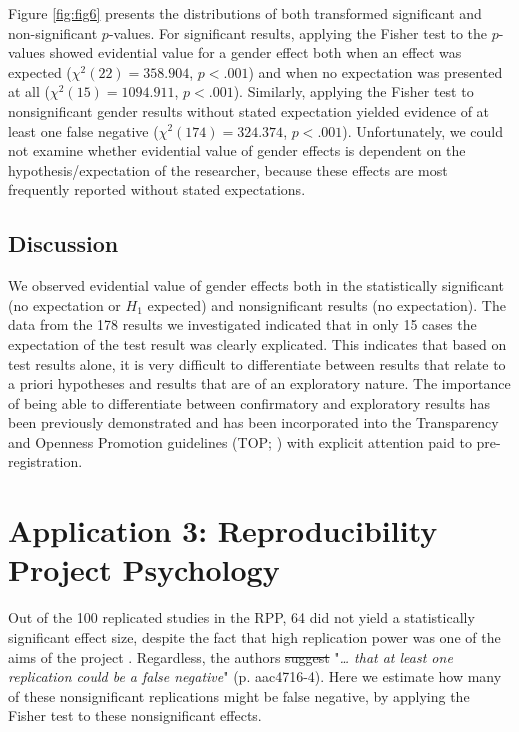 \documentclass{article}
\providecommand{\DIFaddtex}[1]{{\protect\color{blue}\uwave{#1}}} %
\providecommand{\DIFdeltex}[1]{{\protect\color{red}\sout{#1}}}                      %
\providecommand{\DIFaddbegin}{} %
\providecommand{\DIFaddend}{} %
\providecommand{\DIFdelbegin}{} %
\providecommand{\DIFdelend}{} %
\providecommand{\DIFadd}[1]{\texorpdfstring{\DIFaddtex{#1}}{#1}} %
\providecommand{\DIFdel}[1]{\texorpdfstring{\DIFdeltex{#1}}{}} %
\begin{document}
Figure \ref{fig:fig6} presents the distributions of both transformed significant and non-significant $p$-values. For significant results, applying the Fisher test to the $p$-values showed evidential value for a gender effect both when an effect was expected ($\chi^2(22)=358.904$, $p<.001$) and when no expectation was presented at all ($\chi^2(15)=1094.911$, $p<.001$). Similarly, applying the Fisher test to nonsignificant gender results without stated expectation yielded evidence of at least one false negative ($\chi^2(174)=324.374$, $p<.001$). Unfortunately, we could not examine whether evidential value of gender effects is dependent on the hypothesis/expectation of the researcher, because these effects are most frequently reported without stated expectations. 

\subsection*{Discussion}

We observed evidential value of gender effects both in the statistically significant (no expectation or $H_1$ expected) and nonsignificant results (no expectation). The data from the 178 results we investigated indicated that in only 15 cases the expectation of the test result was clearly explicated. This indicates that based on test results alone, it is very difficult to differentiate between results that relate to a priori hypotheses and results that are of an exploratory nature. The importance of being able to differentiate between confirmatory and exploratory results has been previously demonstrated \cite{Wagenmakers2012-jq} and has been incorporated into the Transparency and Openness Promotion guidelines (TOP; \cite{Nosek2015-nr}) with explicit attention paid to pre-registration.

\section*{Application 3: Reproducibility Project Psychology}

Out of the 100 replicated studies in the RPP, 64 did not yield a statistically significant effect size, despite the fact that high replication power was one of the aims of the project \cite{Open_Science_Collaboration2015-zs}. Regardless, the authors \DIFdelbegin \DIFdel{suggest }\DIFdelend \DIFaddbegin \DIFadd{suggested }\DIFaddend "\textit{… that at least one replication could be a false negative}" (p. aac4716-4). Here we estimate how many of these nonsignificant replications might be false negative, by applying the Fisher test to these nonsignificant effects.
\end{document}
